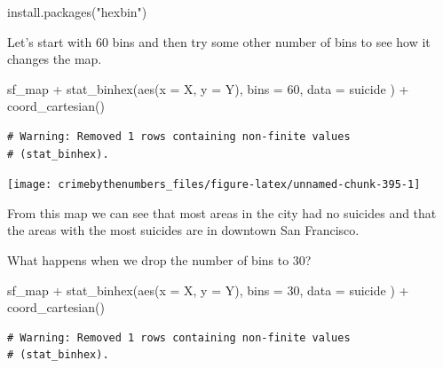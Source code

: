 \documentclass[
  a4paper,
]{krantz}
\makeatletter
\newenvironment{Shaded}{\begin{snugshade}}{\end{snugshade}}
\newcommand{\AttributeTok}[1]{\textcolor[rgb]{0.77,0.63,0.00}{#1}}
\newcommand{\DecValTok}[1]{\textcolor[rgb]{0.00,0.00,0.81}{#1}}
\newcommand{\FunctionTok}[1]{\textcolor[rgb]{0.00,0.00,0.00}{#1}}
\newcommand{\NormalTok}[1]{#1}
\newcommand{\SpecialCharTok}[1]{\textcolor[rgb]{0.00,0.00,0.00}{#1}}
\newcommand{\StringTok}[1]{\textcolor[rgb]{0.31,0.60,0.02}{#1}}
\newenvironment{kframe}{%
\medskip{}
\setlength{\fboxsep}{.8em}
 \def\at@end@of@kframe{}%
 \ifinner\ifhmode%
  \def\at@end@of@kframe{\end{minipage}}%
  \begin{minipage}{\columnwidth}%
 \fi\fi%
 \def\FrameCommand##1{\hskip\@totalleftmargin \hskip-\fboxsep
 \colorbox{shadecolor}{##1}\hskip-\fboxsep
     \hskip-\linewidth \hskip-\@totalleftmargin \hskip\columnwidth}%
 \MakeFramed {\advance\hsize-\width
   \@totalleftmargin\z@ \linewidth\hsize
   \@setminipage}}%
 {\par\unskip\endMakeFramed%
 \at@end@of@kframe}
\renewenvironment{Shaded}{\begin{kframe}}{\end{kframe}}
\makeatother
\begin{document}
\begin{Shaded}
\begin{Highlighting}[]
\FunctionTok{install.packages}\NormalTok{(}\StringTok{"hexbin"}\NormalTok{)}
\end{Highlighting}
\end{Shaded}

Let's start with 60 bins and then try some other number of
bins to see how it changes the map.

\begin{Shaded}
\begin{Highlighting}[]
\NormalTok{sf\_map }\SpecialCharTok{+}
  \FunctionTok{stat\_binhex}\NormalTok{(}\FunctionTok{aes}\NormalTok{(}\AttributeTok{x =}\NormalTok{ X, }\AttributeTok{y =}\NormalTok{ Y),}
    \AttributeTok{bins =} \DecValTok{60}\NormalTok{,}
    \AttributeTok{data =}\NormalTok{ suicide}
\NormalTok{  ) }\SpecialCharTok{+}
  \FunctionTok{coord\_cartesian}\NormalTok{()}
\end{Highlighting}
\end{Shaded}

\begin{verbatim}
# Warning: Removed 1 rows containing non-finite values
# (stat_binhex).
\end{verbatim}

\begin{center}\texttt{[image: crimebythenumbers\_files/figure-latex/unnamed-chunk-395-1]} \end{center}

From this map we can see that most areas in the city had no
suicides and that the areas with the most suicides are in
downtown San Francisco.

What happens when we drop the number of bins to 30?

\begin{Shaded}
\begin{Highlighting}[]
\NormalTok{sf\_map }\SpecialCharTok{+}
  \FunctionTok{stat\_binhex}\NormalTok{(}\FunctionTok{aes}\NormalTok{(}\AttributeTok{x =}\NormalTok{ X, }\AttributeTok{y =}\NormalTok{ Y),}
    \AttributeTok{bins =} \DecValTok{30}\NormalTok{,}
    \AttributeTok{data =}\NormalTok{ suicide}
\NormalTok{  ) }\SpecialCharTok{+}
  \FunctionTok{coord\_cartesian}\NormalTok{()}
\end{Highlighting}
\end{Shaded}

\begin{verbatim}
# Warning: Removed 1 rows containing non-finite values
# (stat_binhex).
\end{verbatim}
\end{document}
